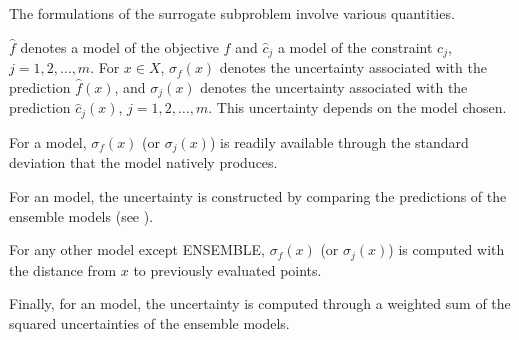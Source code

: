 \documentclass[letterpaper,10pt,english]{sphinxmanual}
\begin{document}
\subsection{}
\label{\detokenize{SgteLib:sgtelib-model-formulation}}
\begin{DUlineblock}{0em}
\item[] The formulations of the surrogate subproblem involve various quantities.
\item[] \(\hat f\) denotes a model of the objective \(f\) and \(\hat c_j\) a model of the constraint \(c_j\), \(j=1,2,\dots,m\). For \(x\in X\), \(\sigma_f(x)\) denotes the uncertainty associated with the prediction \(\hat f(x)\), and \(\sigma_j(x)\) denotes the uncertainty associated with the prediction \(\hat c_j(x)\), \(j=1,2,\dots,m\). This uncertainty depends on the model chosen.
\end{DUlineblock}

\begin{DUlineblock}{0em}
\item[] For a {\hyperref[\detokenize{SgteLib:kriging}]{}} model, \(\sigma_f(x)\) (or \(\sigma_j(x)\)) is readily available through the standard deviation that the model natively produces.
\item[] For an {\hyperref[\detokenize{SgteLib:ensemble-stat}]{}} model, the uncertainty is constructed by comparing the predictions of the ensemble models (see ).
\item[] For any other model except ENSEMBLE, \(\sigma_f(x)\) (or \(\sigma_j(x)\)) is computed with the distance from \(x\) to previously evaluated points.
\item[] Finally, for an {\hyperref[\detokenize{SgteLib:ensemble}]{}} model, the uncertainty is computed through a weighted sum of the squared uncertainties of the ensemble models.
\end{DUlineblock}
\end{document}
